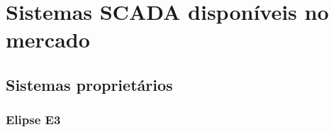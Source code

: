     \begin{figure}[!h]
{}	
\end{figure}

\section{Sistemas SCADA disponíveis no mercado}
\label{sec:sistemas-scada}

\subsection{Sistemas proprietários}
\label{sec:sistemas-scada-proprietarios}

\subsubsection{Elipse E3}
\label{sec:elipse}


